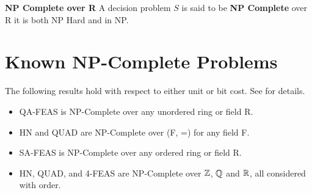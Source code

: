 \begin{definition}{\textbf{NP Complete over R}}
  A decision problem $S$ is said to be \textbf{NP Complete} over R it
  is both NP Hard and in NP.
\end{definition}

\section{Known NP-Complete Problems}

The following results hold with respect to either unit or bit cost.
See \cite{B98} for details.  

\begin{itemize}
\item QA-FEAS is NP-Complete over any unordered ring or field R.
\item HN and QUAD are NP-Complete over (F, =) for any field F.
\item SA-FEAS is NP-Complete over any ordered ring or field R.
\item HN, QUAD, and 4-FEAS are NP-Complete over $\mathbb{Z}$,
  $\mathbb{Q}$ and $\mathbb{R}$, all considered with order.
\end{itemize}


